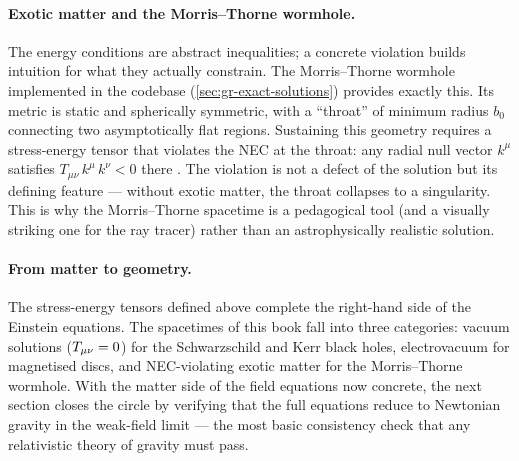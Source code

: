 \paragraph{Exotic matter and the Morris--Thorne wormhole.}

The energy conditions are abstract inequalities; a concrete violation
builds intuition for what they actually constrain.  The Morris--Thorne
wormhole implemented in the codebase (\cref{sec:gr-exact-solutions})
provides exactly this.  Its metric is static and spherically symmetric,
with a ``throat'' of minimum radius $b_0$ connecting two asymptotically
flat regions.  Sustaining this geometry requires a stress-energy tensor
that violates the NEC at the throat: any radial null vector $k^\mu$
satisfies $T_{\mu\nu}\,k^\mu\,k^\nu < 0$
there \cite{MorrisThorne1988}.  The violation is not a defect of the
solution but its defining feature --- without exotic matter, the throat
collapses to a singularity.  This is why the Morris--Thorne spacetime is
a pedagogical tool (and a visually striking one for the ray tracer) rather
than an astrophysically realistic solution.

\paragraph{From matter to geometry.}

The stress-energy tensors defined above complete the right-hand side of
the Einstein equations.  The spacetimes of this book fall into three
categories: vacuum solutions ($T_{\mu\nu} = 0$) for the Schwarzschild
and Kerr black holes, electrovacuum for magnetised discs, and
NEC-violating exotic matter for the Morris--Thorne wormhole.  With the
matter side of the field equations now concrete, the next section closes
the circle by verifying that the full equations reduce to Newtonian
gravity in the weak-field limit --- the most basic consistency check that
any relativistic theory of gravity must pass.
